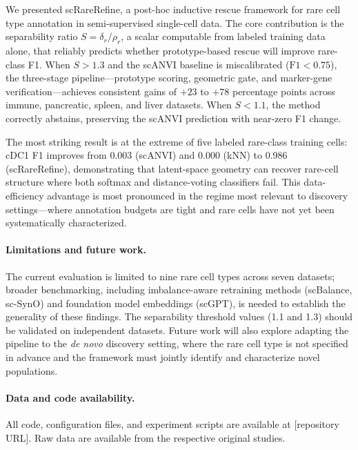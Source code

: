 We presented scRareRefine, a post-hoc inductive rescue framework for rare cell type annotation in semi-supervised single-cell data. The core contribution is the separability ratio $S = \delta_r / \rho_r$, a scalar computable from labeled training data alone, that reliably predicts whether prototype-based rescue will improve rare-class F1. When $S > 1.3$ and the scANVI baseline is miscalibrated ($\text{F1} < 0.75$), the three-stage pipeline---prototype scoring, geometric gate, and marker-gene verification---achieves consistent gains of $+23$ to $+78$ percentage points across immune, pancreatic, spleen, and liver datasets. When $S < 1.1$, the method correctly abstains, preserving the scANVI prediction with near-zero F1 change.

The most striking result is at the extreme of five labeled rare-class training cells: cDC1 F1 improves from 0.003 (scANVI) and 0.000 (kNN) to 0.986 (scRareRefine), demonstrating that latent-space geometry can recover rare-cell structure where both softmax and distance-voting classifiers fail. This data-efficiency advantage is most pronounced in the regime most relevant to discovery settings---where annotation budgets are tight and rare cells have not yet been systematically characterized.

\paragraph{Limitations and future work.}
The current evaluation is limited to nine rare cell types across seven datasets; broader benchmarking, including imbalance-aware retraining methods (scBalance, sc-SynO) and foundation model embeddings (scGPT), is needed to establish the generality of these findings. The separability threshold values (1.1 and 1.3) should be validated on independent datasets. Future work will also explore adapting the pipeline to the \emph{de novo} discovery setting, where the rare cell type is not specified in advance and the framework must jointly identify and characterize novel populations.

\paragraph{Data and code availability.}
All code, configuration files, and experiment scripts are available at [repository URL]. Raw data are available from the respective original studies.
